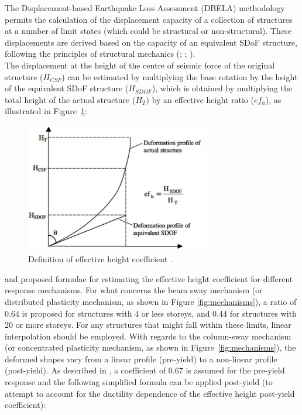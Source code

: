 The Displacement-based Earthquake Loss Assessment (DBELA) methodology permits the calculation of the displacement capacity of a collection of structures at a number of limit states (which could be structural or non-structural). These displacements are derived based on the capacity of an equivalent SDoF structure, following the principles of structural mechanics (\cite{CrowleyEtAl2004}; \cite{BalEtAl2010}; \cite{SilvaEtAl2013}).\\
The displacement at the height of the centre of seismic force of the original structure ($H_{CSF}$) can be estimated by multiplying the base rotation by the height of the equivalent SDoF structure ($H_{SDOF}$), which is obtained by multiplying the total height of the actual structure ($H_T$) by an effective height ratio ($ef_h$), as illustrated in Figure~\ref{fig:efh}:

\begin{figure}[htb]
  \centering
      \includegraphics[width=8cm]{Figures/effective_height.png}
  \caption{Definition of effective height coefficient \cite{GlaisterPinho2003}.}
  \label{fig:efh}
\end{figure}

\cite{PinhoEtAl2002} and \cite{GlaisterPinho2003} proposed formulae for estimating the effective height coefficient for different response mechanisms. For what concerns the beam sway mechanism (or distributed plasticity mechanism, as shown in Figure \ref{fig:mechanisms}), a ratio of 0.64 is proposed for structures with 4 or less storeys, and 0.44 for structures with 20 or more storeys. For any structures that might fall within these limits, linear interpolation should be employed. With regards to the column-sway mechanism (or concentrated plasticity mechanism, as shown in Figure~\ref{fig:mechanisms}), the deformed shapes vary from a linear profile (pre-yield) to a non-linear profile (post-yield). As described in \cite{GlaisterPinho2003}, a coefficient of 0.67 is assumed for the pre-yield response and the following simplified formula can be applied post-yield (to attempt to account for the ductility dependence of the effective height post-yield coefficient):

